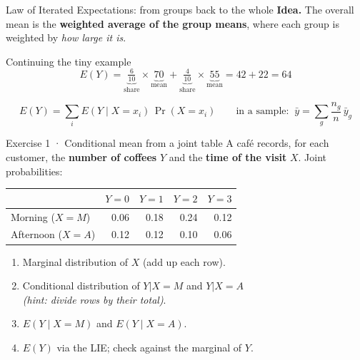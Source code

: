 \documentclass[
  11pt,
  ignorenonframetext,
  aspectratio=169,
]{beamer}
\begin{document}
\begin{frame}{Law of Iterated Expectations: from groups back to the
whole}
\protect{}\label{law-of-iterated-expectations-from-groups-back-to-the-whole}
\textbf{Idea.} The overall mean is the \textbf{weighted average of the
group means}, where each group is weighted by \emph{how large it is}.

\begin{block}{Continuing the tiny example}
\protect{}\label{continuing-the-tiny-example}
\[E(Y)=\underbrace{\tfrac{6}{10}}_{\text{share}}\times\underbrace{70}_{\text{mean}}+\underbrace{\tfrac{4}{10}}_{\text{share}}\times\underbrace{55}_{\text{mean}}=42+22=64\]
\end{block}

\[E(Y)=\sum_{i} E(Y\mid X=x_i)\,\Pr(X=x_i)\qquad\text{in a sample: }\ \bar y=\sum_g \frac{n_g}{n}\,\bar y_g\]

\end{frame}

\begin{frame}{Exercise 1 · Conditional mean from a joint table}
\protect{}\label{exercise-1-conditional-mean-from-a-joint-table}
A café records, for each customer, the \textbf{number of coffees} \(Y\)
and the \textbf{time of the visit} \(X\). Joint probabilities:

\begin{center}
\begin{tabular}{@{}lrrrr@{}}
\toprule
 & \(Y=0\) & \(Y=1\) & \(Y=2\) & \(Y=3\) \\
\midrule
Morning (\(X=M\))   & 0.06 & 0.18 & 0.24 & 0.12 \\
Afternoon (\(X=A\)) & 0.12 & 0.12 & 0.10 & 0.06 \\
\bottomrule
\end{tabular}
\end{center}

\begin{enumerate}
\item Marginal distribution of \(X\) (add up each row).
\item Conditional distribution of \(Y|X=M\) and \(Y|X=A\) \\
\emph{(hint: divide rows by their total)}.
\item \(E(Y\mid X=M)\) and \(E(Y\mid X=A)\).
\item \(E(Y)\) via the LIE; check against the marginal of \(Y\).
\end{enumerate}
\end{frame}
\end{document}
